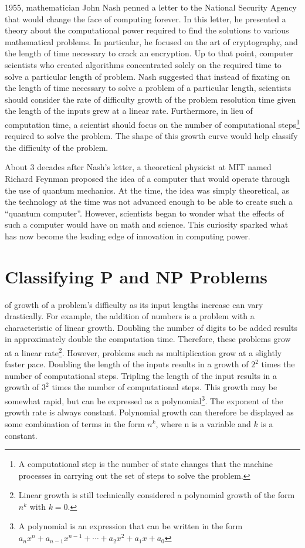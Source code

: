 \documentclass[10pt,journal,compsoc]{IEEEtran}
\begin{document}
 1955, mathematician John Nash penned a letter to the National Security Agency that would change the face of computing forever\cite{NSA}. 
In this letter, he presented a theory about the computational power required to find the solutions to various mathematical problems. In particular, he focused on the art of cryptography, and the length of time necessary to crack an encryption. Up to that point, computer scientists who created algorithms concentrated solely on the required time to solve a particular length of problem. Nash suggested that instead of fixating on the length of time necessary to solve a problem of a particular length, scientists should consider the rate of difficulty growth of the problem resolution time given the length of the inputs grew at a linear rate. Furthermore, in lieu of computation time, a scientist should focus on the number of computational steps\footnote{A computational step is the number of state changes that the machine processes  in carrying out the set of steps to solve the problem.} required to solve the problem.  The shape of this growth curve would help classify the difficulty of the problem. 

About 3 decades after Nash's letter, a theoretical physicist at MIT named Richard Feynman proposed the idea of a computer that would operate through the use of quantum mechanics. At the time, the idea was simply theoretical, as the technology at the time was not advanced enough to be able to create such a ``quantum computer''. However, scientists began to wonder what the effects of such a computer would have on math and science. This curiosity sparked what has now become the leading edge of innovation in computing power. 


\section{Classifying P and NP Problems}
 of growth of a problem's difficulty as its input lengths increase can vary drastically. For example, the addition of numbers is a problem with a characteristic of linear growth. Doubling the number of digits to be added results in approximately double the computation time. Therefore, these problems grow at a linear rate\footnote{Linear growth is still technically considered a polynomial growth of the form $n^k$ with $k=0$.}.  However, problems such as multiplication grow at a slightly faster pace. Doubling the length of the inputs results in a growth of $2^2$ times the number of computational steps. Tripling the length of the input  results in a growth of $3^2$ times the number of computational steps. This growth may be somewhat rapid, but can be expressed as a polynomial\footnote{A polynomial is an expression that can be written in the form $a_{n}x^{n}+a_{n-1}x^{n-1}+\dotsb +a_{2}x^{2}+a_{1}x+a_{0}$ }. The exponent of the growth rate is always constant. Polynomial growth can therefore be displayed as some combination of terms in the form $n^k$, where n is a variable and $k$ is a constant.
\end{document}
